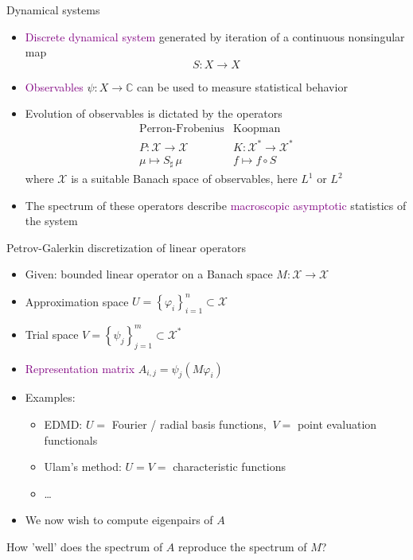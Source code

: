 \documentclass[
  english,            %
  aspectratio=169,    %
]{tumbeamer}
\newenvironment{emphbox}
  {\begin{tcolorbox}[colback=blue!5!white,colframe=blue!75!black]}
  {\end{tcolorbox}}
\newcommand{\bbC}{{\mathbb C}}
\newcommand{\cX}{\mathcal{X}}
\renewcommand{\emph}[1]{\textcolor{purple}{#1}}
\begin{document}
\begin{frame}{Dynamical systems}
  
\begin{itemize}
  \item \emph{Discrete dynamical system} generated by iteration of a continuous nonsingular map 
  \begin{equation}
    S : X \to X
  \end{equation}
  \item \emph{Observables} $\psi : X \to \bbC$ can be used to measure statistical behavior 
  \item Evolution of observables is dictated by the operators
  \begin{equation*}
    \begin{matrix}
      \text{Perron-Frobenius} & \text{Koopman} \\
      P : \cX \to \cX & K : \cX^* \to \cX^* \\
      \mu \mapsto S_\sharp\,\mu & f \mapsto f \circ S 
    \end{matrix}
  \end{equation*}
  where $\cX$ is a suitable Banach space of observables, here $L^1$ or $L^2$
  \item The spectrum of these operators describe \emph{macroscopic asymptotic} statistics of the system
\end{itemize}

\end{frame}

\begin{frame}{Petrov-Galerkin discretization of linear operators}

\begin{itemize}
  \item Given: bounded linear operator on a Banach space $M : \cX \to \cX$
  \item Approximation space $U = \left\{ \varphi_i \right\}_{i=1}^n \subset \cX$
  \item Trial space $V = \left\{ \psi_j \right\}_{j=1}^m \subset \cX^*$
  \item \emph{Representation matrix} $A_{i,j} = \psi_j( M \varphi_i )$
  \item Examples:
  \begin{itemize}
    \item EDMD: $U = $ Fourier / radial basis functions,$\ $ $V = $ point evaluation functionals
    \item Ulam's method: $U = V = $ characteristic functions
    \item \dots
  \end{itemize}
  \item We now wish to compute eigenpairs of $A$
\end{itemize}

\begin{emphbox}
  How 'well' does the spectrum of $A$ reproduce the spectrum of $M$?
\end{emphbox}
  
\end{frame}
\end{document}

